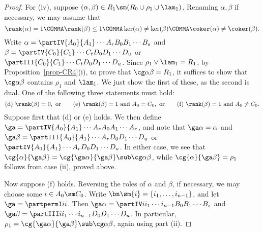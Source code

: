 \begin{proof}
For (iv), suppose $(\alpha,\beta)\in R_1\sm (R_0 \cup \rho_1 \cup \lam_1 )$.  
Renaming $\alpha,\beta$ if necessary, we may assume that
\[
\rank(\alpha)=1\COMMA
\rank(\beta)\leq1 \COMMA
\ker(\alpha)\not=\ker(\beta)\COMMA
\coker(\alpha)\not=\coker(\beta).
\]
Write $\alpha=\partIV{A_0}{A_1}\cdots{A_r}{B_0}{B_1}\cdots{B_s}$ and $\beta=\partIV{C_0}{C_1}\cdots{C_t}{D_0}{D_1}\cdots{D_u}$ or $\partIII{C_0}{C_1}\cdots{C_t}{D_0}{D_1}\cdots{D_u}$.
Since $\rho_1\vee\lam_1=R_1$, by Proposition~\ref{prop-CR4}(i), to prove that $\cg\alpha\beta=R_1$, it suffices to show that $\cg\alpha\beta$ contains $\rho_1$ and $\lam_1$.  We just show the first of these, as the second is dual.  One of the following three statements must hold: 
\[
\text{(d)}\ \rank(\beta)=0,\ \text{or}\ \ \ \ \ \ 
\text{(e)}\ \rank(\beta)=1\  \text{and}\  A_0=C_0,\ \text{or}\ \ \  \ \ \ 
\text{(f)}\ \rank(\beta)=1\ \text{and}\ A_0\not=C_0.
\]
Suppose first that (d) or (e) holds.  We then define $\ga=\partIV{A_0}{A_1}\cdots{A_r}{A_0}{A_1}\cdots{A_r}$,
and note that $\ga\alpha=\alpha$ and $\ga\beta=\partIII{A_0}{A_1}\cdots{A_r}{D_0}{D_1}\cdots{D_u}$ or $\partIV{A_0}{A_1}\cdots{A_r}{D_0}{D_1}\cdots{D_u}$.
In either case, we see that $\cg{\alpha}{\ga\beta}=\cg{\ga\alpha}{\ga\beta}\sub\cg\alpha\beta$, while ${\cg{\alpha}{\ga\beta}=\rho_1}$ follows from case (ii), proved above.  

Now suppose (f) holds.  Reversing the roles of $\alpha$ and $\beta$, if necessary, we may choose some $i\in A_0\sm C_0$.  Write $\bn\sm\{i\}=\{i_1,\ldots,i_{n-1}\}$, and let $\ga=\partpermI ii$.
Then $\ga\alpha=\partIV i{i_1}\cdots{i_{n-1}}{B_0}{B_1}\cdots{B_s}$ and $\ga\beta=\partIII i{i_1}\cdots{i_{n-1}}{D_0}{D_1}\cdots{D_u}$.
In particular, $\rho_1=\cg{\ga\alpha}{\ga\beta}\sub\cg\alpha\beta$, again using part (ii).  \end{proof}



